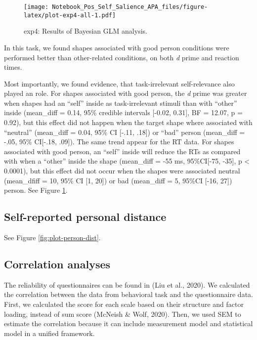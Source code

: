 \documentclass[
  english,
  man]{apa6}
\begin{document}
\begin{figure}
\centering
\texttt{[image: Notebook\_Pos\_Self\_Salience\_APA\_files/figure-latex/plot-exp4-all-1.pdf]}
\caption{\label{fig:plot-exp4-all}exp4: Results of Bayesian GLM analysis.}
\end{figure}

In this task, we found shapes associated with good person conditions were performed better than other-related conditions, on both \emph{d} prime and reaction times.

Most importantly, we found evidence, that task-irrelevant self-relevance also played an role. For shapes associated with good person, the \emph{d} prime was greater when shapes had an ``self'' inside as task-irrelevant stimuli than with ``other'' inside (mean\_diff = 0.14, 95\% credible intervals {[}-0.02, 0.31{]}, BF = 12.07, p = 0.92), but this effect did not happen when the target shape where associated with ``neutral'' (mean\_diff = 0.04, 95\% CI {[}-.11, .18{]}) or ``bad'' person (mean\_diff = -.05, 95\% CI{[}-.18, .09{]}). The same trend appear for the RT data. For shapes associated with good person, an ``self'' inside will reduce the RTs as compared with when a ``other'' inside the shape (mean\_diff = -55 ms, 95\%CI{[}-75, -35{]}, p \textless{} 0.0001), but this effect did not occur when the shapes were associated neutral (mean\_dfiff = 10, 95\% CI {[}1, 20{]}) or bad (mean\_diff = 5, 95\%CI {[}-16, 27{]}) person. See Figure \ref{fig:plot-exp4-all}.

\hypertarget{self-reported-personal-distance}{%
\subsection{Self-reported personal distance}\label{self-reported-personal-distance}}

See Figure \ref{fig:plot-person-dist}.

\hypertarget{correlation-analyses}{%
\subsection{Correlation analyses}\label{correlation-analyses}}

The reliability of questionnaires can be found in (Liu et al., 2020). We calculated the correlation between the data from behavioral task and the questionnaire data. First, we calculated the score for each scale based on their structure and factor loading, instead of sum score (McNeish \& Wolf, 2020). Then, we used SEM to estimate the correlation because it can include measurement model and statistical model in a unified framework.
\end{document}
